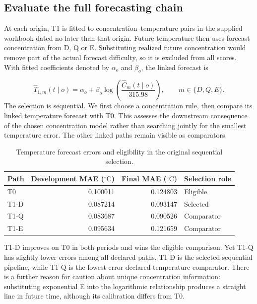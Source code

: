 \documentclass[11pt,a4paper]{article}
\newcommand{\p}[2]{#2\par}
\newcommand{\txt}[2]{#2}
\newcommand{\degC}{\ensuremath{{}^{\circ}\mathrm{C}}}
\begin{document}
\subsection{Evaluate the full forecasting chain}
\p{TEM03}{At each origin, T1 is fitted to concentration--temperature pairs in the supplied workbook dated no later than that origin. Future temperature then uses forecast concentration from D, Q or E. Substituting realized future concentration would remove part of the actual forecast difficulty, so it is excluded from all scores. With fitted coefficients denoted by $\alpha_o$ and $\beta_o$, the linked forecast is}\nopagebreak
\begin{equation}\label{eq:linked}
\widehat T_{1,m}(t\mid o)=\alpha_o+\beta_o\log\!\left(\frac{\widehat C_m(t\mid o)}{315.98}\right),\qquad m\in\{D,Q,E\}.
\end{equation}
\p{TEM04}{The selection is sequential. We first choose a concentration rule, then compare its linked temperature forecast with T0. This assesses the downstream consequence of the chosen concentration model rather than searching jointly for the smallest temperature error. The other linked paths remain visible as comparators.}
\begin{table}[H]\centering\small
\caption{\txt{TC06}{Temperature forecast errors and eligibility in the original sequential selection.}}\label{tab:temp-errors}
\begin{tabular}{lrrl}\toprule
Path & Development MAE (\degC) & Final MAE (\degC) & Selection role\\\midrule
T0 & 0.100011 & 0.124803 & Eligible\\
T1-D & 0.087214 & 0.093147 & Selected\\
T1-Q & 0.083687 & 0.090526 & Comparator\\
T1-E & 0.095634 & 0.121659 & Comparator\\\bottomrule
\end{tabular}
\end{table}
\p{TEM05}{T1-D improves on T0 in both periods and wins the eligible comparison. Yet T1-Q has slightly lower errors among all declared paths. T1-D is the selected sequential pipeline, while T1-Q is the lowest-error declared temperature comparator. There is a further reason for caution about unique concentration information: substituting exponential E into the logarithmic relationship produces a straight line in future time, although its calibration differs from T0.}
\end{document}
